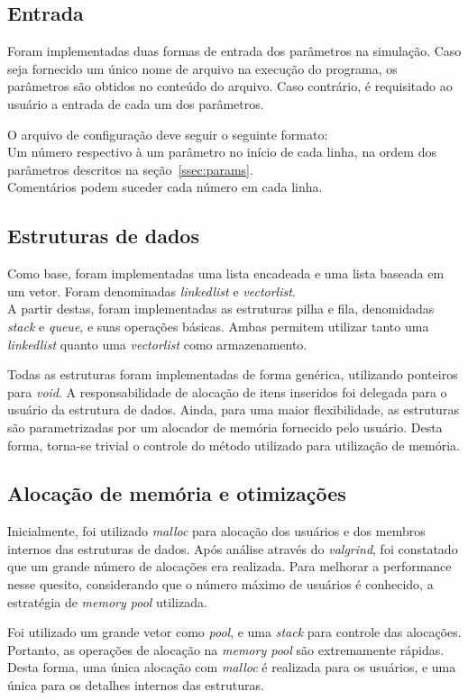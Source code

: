 \documentclass{article}
\begin{document}
\subsection{Entrada}
Foram implementadas duas formas de entrada dos parâmetros na simulação. Caso seja fornecido um único nome de arquivo na execução do programa, os parâmetros são obtidos no conteúdo do arquivo. Caso contrário, é requisitado ao usuário a entrada de cada um dos parâmetros.

O arquivo de configuração deve seguir o seguinte formato:\\
Um número respectivo à um parâmetro no início de cada linha, na ordem dos parâmetros descritos na seção~\ref{ssec:params}.\\
Comentários podem suceder cada número em cada linha.

\subsection{Estruturas de dados}
Como base, foram implementadas uma lista encadeada e uma lista baseada em um vetor. Foram denominadas \textit{linkedlist} e \textit{vectorlist}.\\
A partir destas, foram implementadas as estruturas pilha e fila, denomidadas \textit{stack} e \textit{queue}, e suas operações básicas. Ambas permitem utilizar tanto uma \textit{linkedlist} quanto uma \textit{vectorlist} como armazenamento.

Todas as estruturas foram implementadas de forma genérica, utilizando ponteiros para \textit{void}. A responsabilidade de alocação de itens inseridos foi delegada para o usuário da estrutura de dados.
Ainda, para uma maior flexibilidade, as estruturas são parametrizadas por um alocador de memória fornecido pelo usuário. Desta forma, torna-se trivial o controle do método utilizado para utilização de memória.

\subsection{Alocação de memória e otimizações}
Inicialmente, foi utilizado \textit{malloc} para alocação dos usuários e dos membros internos das estruturas de dados. Após análise através do \textit{valgrind}, foi constatado que um grande número de alocações era realizada. Para melhorar a performance nesse quesito, considerando que o número máximo de usuários é conhecido, a estratégia de \textit{memory pool} utilizada.

Foi utilizado um grande vetor como \textit{pool}, e uma \textit{stack} para controle das alocações. Portanto, as operações de alocação na \textit{memory pool} são extremamente rápidas. Desta forma, uma única alocação com \textit{malloc} é realizada para os usuários, e uma única para os detalhes internos das estruturas.
\end{document}
